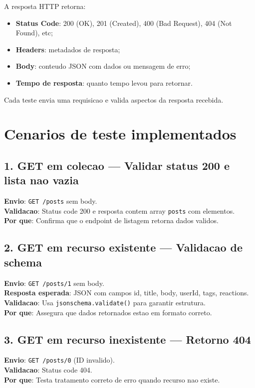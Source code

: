 \documentclass[11pt,a4paper]{article}
\begin{document}
A resposta HTTP retorna:
\begin{itemize}
    \item \textbf{Status Code}: 200 (OK), 201 (Created), 400 (Bad Request), 404 (Not Found), etc;
    \item \textbf{Headers}: metadados de resposta;
    \item \textbf{Body}: conteudo JSON com dados ou mensagem de erro;
    \item \textbf{Tempo de resposta}: quanto tempo levou para retornar.
\end{itemize}

Cada teste envia uma requisicao e valida aspectos da resposta recebida.

\section{Cenarios de teste implementados}

\subsection{1. GET em colecao --- Validar status 200 e lista nao vazia}
\textbf{Envio}: \texttt{GET /posts} sem body. \\
\textbf{Validacao}: Status code 200 e resposta contem array \texttt{posts} com elementos. \\
\textbf{Por que}: Confirma que o endpoint de listagem retorna dados validos.

\subsection{2. GET em recurso existente --- Validacao de schema}
\textbf{Envio}: \texttt{GET /posts/1} sem body. \\
\textbf{Resposta esperada}: JSON com campos id, title, body, userId, tags, reactions. \\
\textbf{Validacao}: Usa \texttt{jsonschema.validate()} para garantir estrutura. \\
\textbf{Por que}: Assegura que dados retornados estao em formato correto.

\subsection{3. GET em recurso inexistente --- Retorno 404}
\textbf{Envio}: \texttt{GET /posts/0} (ID invalido). \\
\textbf{Validacao}: Status code 404. \\
\textbf{Por que}: Testa tratamento correto de erro quando recurso nao existe.
\end{document}
